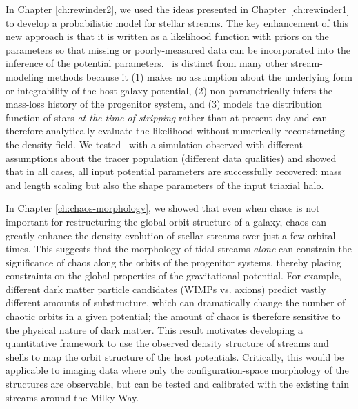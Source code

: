 In Chapter \ref{ch:rewinder2}, we used the ideas presented in Chapter~\ref{ch:rewinder1} to develop a probabilistic model for stellar streams. The key enhancement of this new approach is that it is written as a likelihood function with priors on the parameters so that missing or poorly-measured data can be incorporated into the inference of the potential parameters. \rewinder\ is distinct from many other stream-modeling methods because it (1) makes no assumption about the underlying form or integrability of the host galaxy potential, (2) non-parametrically infers the mass-loss history of the progenitor system, and (3) models the distribution function of stars \emph{at the time of stripping} rather than at present-day and can therefore analytically evaluate the likelihood without numerically reconstructing the density field. We tested \rewinder\ with a simulation observed with different assumptions about the tracer population (different data qualities) and showed that in all cases, all input potential parameters are successfully recovered: mass and length scaling but also the shape parameters of the input triaxial halo.

In Chapter \ref{ch:chaos-morphology}, we showed that even when chaos is not important for restructuring the global orbit structure of a galaxy, chaos can greatly enhance the density evolution of stellar streams over just a few orbital times. This suggests that the morphology of tidal streams \emph{alone} can constrain the significance of chaos along the orbits of the progenitor systems, thereby placing constraints on the global properties of the gravitational potential. For example, different dark matter particle candidates (WIMPs vs. axions) predict vastly different amounts of substructure, which can dramatically change the number of chaotic orbits in a given potential; the amount of chaos is therefore sensitive to the physical nature of dark matter. This result motivates developing a quantitative framework to use the observed density structure of streams and shells to map the orbit structure of the host potentials. Critically, this would be applicable to imaging data where only the configuration-space morphology of the structures are observable, but can be tested and calibrated with the existing thin streams around the Milky Way.

